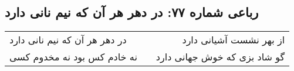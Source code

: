 \begin{center}
\section*{رباعی شماره ۷۷: در دهر هر آن که نیم نانی دارد}
\label{sec:sh077}
\begin{longtable}{l p{0.5cm} r}
در دهر هر آن که نیم نانی دارد
&&
از بهر نشست آشیانی دارد
\\
نه خادم کس بود نه مخدوم کسی
&&
گو شاد بزی که خوش جهانی دارد
\\
\end{longtable}
\end{center}
